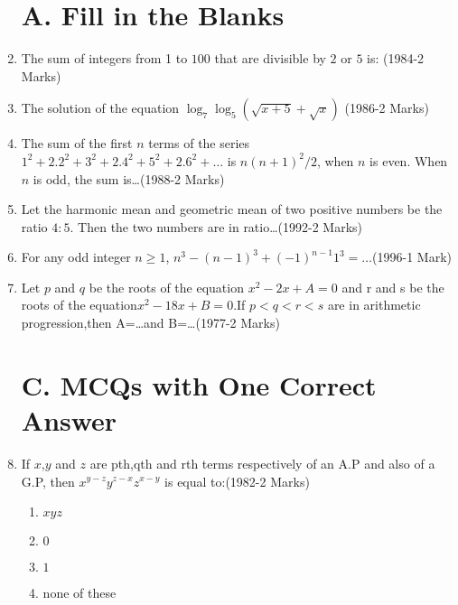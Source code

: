 \documentclass[journal,12pt,twocolumn]{IEEEtran}
\theoremstyle{remark}
\begin{document}
\begin{enumerate}
\section{A. Fill in the Blanks}


	\item  The sum of integers from 1 to $100$ that are divisible by $2$ or $5$ is: \hfill(1984-2 Marks)
    
    
	    \item  The solution of the equation                                    
       ${\log_{7}\log_{5}(\sqrt{x+5}+\sqrt{x})}$ \hfill(1986-2 Marks)
     
     
	     \item The sum of the first $n$ terms of the series ${1^2+2.2^2+3^2+2.4^2+5^2+2.6^2+\dots}$ is
   ${n (n+1)^2 /2}$, when $n$ is even. When $n$ is odd, the sum 
   is\dots\hfill(1988-2 Marks)
        
          
		  \item Let the harmonic mean and geometric mean of two positive numbers be the ratio $4:5$. Then the two numbers are in 
    ratio\dots\hfill(1992-2 Marks)
          
     
	     \item For any odd integer $n \ge 1$, ${n^3-(n-1)^3+(-1)^{n-1} 1^3=\dots}$\hfill(1996-1 Mark)
       
     
	     \item  Let $p$ and $q$ be the roots of the equation                    ${x^2-2x+A=0}$ and r and s be the roots of the                     equation${x^2-18x+B=0}$.If ${p<q<r<s}$ are                                      in arithmetic progression,then A=\dots and B=\dots\hfill(1977-2 Marks)
     
    
    \section{ C. MCQs with One Correct Answer}
        
    
	    \item  If $x$,$y$ and $z$ are pth,qth and rth terms respectively of an A.P and also of a G.P, then ${x^{y-z} y^{z-x} z^{x-y}}$ 
        is equal to:\hfill(1982-2 Marks)
\begin{enumerate} 
  \item $xyz$ 
  \item $0$
  \item $1$ 
  \item none of these
  \end{enumerate}


\end{enumerate}
\end{document}
